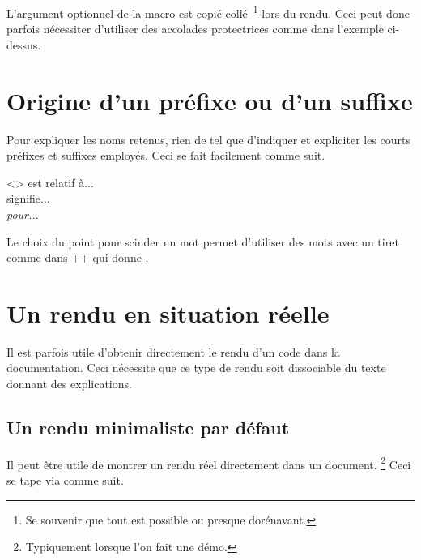 \begin{tdocwarn}
    L'argument optionnel de la macro  est copié-collé\,%
    \footnote{
        Se souvenir que tout est possible ou presque dorénavant.
    }
    lors du rendu. Ceci peut donc parfois nécessiter d'utiliser des accolades protectrices comme dans l'exemple ci-dessus.
\end{tdocwarn}



\section{Origine d'un préfixe ou d'un suffixe}

Pour expliquer les noms retenus, rien de tel que d'indiquer et expliciter les courts préfixes et suffixes employés. Ceci se fait facilement comme suit.


\begin{tdoclatex}<>
 est relatif à...    \\
 signifie... \\
\emph{ pour...}
\end{tdoclatex}


\begin{tdocrem}
    Le choix du point pour scinder un mot permet d'utiliser des mots avec un tiret comme dans \tdoclatexin++ qui donne .
\end{tdocrem}


\section{Un rendu en situation réelle}
\label{tutodoc-showcase}

Il est parfois utile d'obtenir directement le rendu d'un code dans la documentation. Ceci nécessite que ce type de rendu soit dissociable du texte donnant des explications.



\subsection{Un rendu minimaliste par défaut}

\begin{tdocexa}
    Il peut être utile de montrer un rendu réel directement dans un document.%
    \footnote{
        Typiquement lorsque l'on fait une démo.
    }
    Ceci se tape via  comme suit.

\end{tdocexa}



